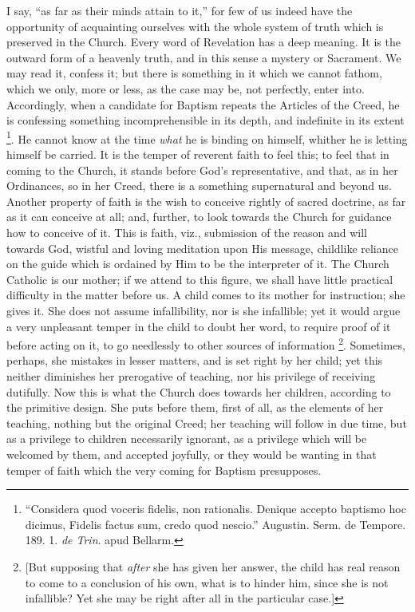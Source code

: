 I say, ``as far as their minds attain to it,'' for few of
us indeed have the opportunity of acquainting ourselves with the whole
system of truth which is preserved in the Church. Every word of
Revelation has a deep meaning. It is the outward form of a heavenly
truth, and in this sense a mystery or Sacrament. We may read it,
confess it; but there is something in it which we cannot fathom, which
we only, more or less, as the case may be, not perfectly, enter into.
Accordingly, when a candidate for Baptism repeats the Articles of the
Creed, he is confessing something incomprehensible in its depth, and
indefinite in its extent \footnote{``Considera quod voceris fidelis, non
rationalis. Denique accepto baptismo hoc dicimus, Fidelis factus sum,
credo quod nescio.'' Augustin. Serm. de Tempore. 189. 1. \emph{de
Trin}. apud Bellarm.}.
He cannot know at the time \emph{what} he is binding on himself,
whither he is letting himself be carried. It is the temper of reverent
faith to feel this; to feel that in coming to the Church, it stands
before God's representative, and that, as in her Ordinances, so in her
Creed, there is a something supernatural and beyond us. Another
property of faith is the wish to conceive rightly of sacred doctrine,
as far as it can conceive at all; and, further, to look towards the
Church for guidance how to conceive of it. This is faith, viz.,
submission of the reason and will towards God, wistful and loving
meditation upon His message, childlike reliance on the guide which is
ordained by Him to be the interpreter of it. The Church Catholic is
our mother; if we attend to this figure, we shall have little
practical difficulty in the matter before us. A child comes to its
mother for instruction; she gives it. She does not assume
infallibility, nor is she infallible; yet it would argue a very
unpleasant temper in the child to doubt her word, to require proof of
it before acting on it, to go needlessly to other sources of
information \footnote{[But supposing that \emph{after} she has
given her answer, the child has real reason to come to a conclusion of
his own, what is to hinder him, since she is not infallible? Yet she
may be right after all in the particular case.]}. Sometimes,
perhaps, she mistakes in lesser matters, and is set right by her
child; yet this neither diminishes her prerogative of teaching, nor
his privilege of receiving dutifully. Now this is what the Church does
towards her children, according to the primitive design. She puts
before them, first of all, as the elements of her teaching, nothing
but the original Creed; her teaching will follow in due time, but as a
privilege to children necessarily ignorant, as a privilege which will
be welcomed by them, and accepted joyfully, or they would be wanting
in that temper of faith which the very coming for Baptism presupposes.

